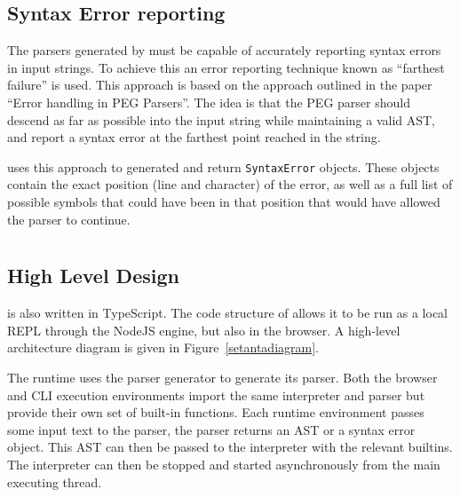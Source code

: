 \subsection{Syntax Error reporting}

The parsers generated by \tsPEG{} must be capable of accurately reporting syntax errors in input strings. To achieve this an error reporting technique known as ``farthest failure'' is used. This approach is based on the approach outlined in the paper ``Error handling in PEG Parsers''\cite{pegerrors}. The idea is that the PEG parser should descend as far as possible into the input string while maintaining a valid AST, and report a syntax error at the farthest point reached in the string.

\tsPEG{} uses this approach to generated and return \verb|SyntaxError| objects. These objects contain the exact position (line and character) of the error, as well as a full list of possible symbols that could have been in that position that would have allowed the parser to continue.

\section{\Setanta{}} \label{setantasolution}

\subsection{High Level Design}
\Setanta{} is also written in TypeScript. The code structure of \Setanta{} allows it to be run as a local REPL through the NodeJS engine, but also in the browser. A high-level architecture diagram is given in Figure~\ref{setantadiagram}.

The \Setanta{} runtime uses the \tsPEG{} parser generator to generate its parser. Both the browser and CLI execution environments import the same interpreter and parser but provide their own set of built-in functions. Each runtime environment passes some input text to the parser, the parser returns an AST or a syntax error object. This AST can then be passed to the interpreter with the relevant builtins. The interpreter can then be stopped and started asynchronously from the main executing thread.

